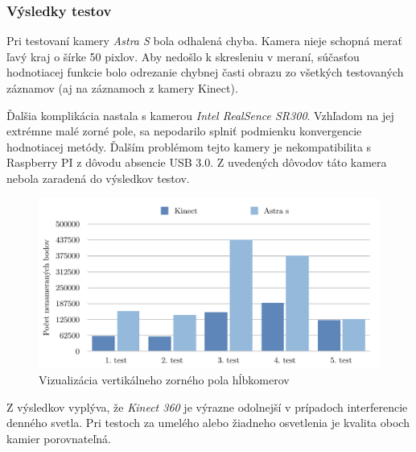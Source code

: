 \subsubsection{Výsledky testov}
Pri testovaní kamery \textit{Astra S} bola odhalená chyba. Kamera nieje schopná merať ľavý kraj o šírke 50 pixlov. Aby nedošlo k skresleniu v meraní, súčasťou hodnotiacej funkcie bolo odrezanie chybnej časti obrazu zo všetkých testovaných záznamov (aj na záznamoch z kamery Kinect). 

Ďalšia komplikácia nastala s kamerou \textit{Intel RealSence SR300}. Vzhľadom na jej extrémne malé zorné pole, sa nepodarilo splniť podmienku konvergencie hodnotiacej metódy. Ďalším problémom tejto kamery je nekompatibilita s Raspberry PI z dôvodu absencie USB 3.0. Z uvedených dôvodov táto kamera nebola zaradená do výsledkov testov.  


\begin{figure}[H]
\begin{center}
	\includegraphics[scale=0.7]{images/noiseGraph}
	\caption{Vizualizácia vertikálneho zorného pola hĺbkomerov}
	\end{center}
\end{figure}

Z výsledkov vyplýva, že \textit{Kinect 360} je výrazne odolnejší v prípadoch interferencie denného svetla. Pri testoch za umelého alebo žiadneho osvetlenia je kvalita oboch kamier porovnateľná. 
















